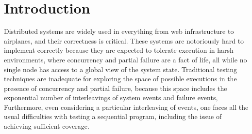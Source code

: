 \chapter{Introduction}
\label{chap:intro}


Distributed systems are widely used
  in everything from web infrastructure to airplanes,
  and their correctness is critical.
These systems are notoriously hard to implement correctly
  because they are expected to tolerate execution in harsh environments,
  where concurrency and partial failure are a fact of life,
  all while no single node has access to a global view of the system state.
Traditional testing techniques are inadequate
  for exploring the space of possible executions
  in the presence of concurrency and partial failure,
  because this space includes the exponential number of
  interleavings of system events and failure events,
Furthermore, even considering a particular interleaving of events,
  one faces all the usual difficulties with testing a sequential program,
  including the issue of achieving sufficient coverage.

